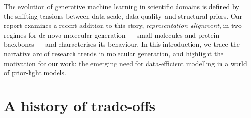 \documentclass[12pt,a4paper,twoside]{report}
\begin{document}
%


The evolution of generative machine learning in scientific domains is defined by the shifting tensions between data scale, data quality, and structural priors. Our report examines a recent addition to this story, \emph{representation alignment}, in two regimes for de-novo molecular generation --- small molecules and protein backbones --- and characterises its behaviour. In this introduction, we trace the narrative arc of research trends in molecular generation, and highlight the motivation for our work: the emerging need for data-efficient modelling in a world of prior-light models.

\section{A history of trade-offs}
\end{document}
